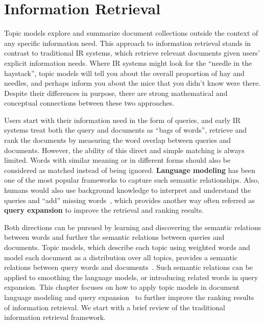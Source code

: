 \chapter{Information Retrieval}
\label{ch:ir}

Topic models explore and summarize document collections outside the context of any specific information need.
This approach to information retrieval stands in contrast to traditional IR systems, which retrieve relevant documents given users' explicit information needs.
Where IR systems might look for the ``needle in the haystack'', topic models will tell you about the overall proportion of hay and needles, and perhaps inform you about the mice that you didn't know were there.
Despite their differences in purpose, there are strong mathematical and conceptual connections between these two approaches.



Users start with their information need in the form of queries, and early IR systems treat both the query and documents as ``bags of words'', retrieve and rank the documents by measuring the word overlap between queries and documents.
However, the ability of this direct and simple matching is always
limited. Words with similar meaning or in different forms should also
be considered as matched instead of being ignored. \textbf{Language
  modeling} has been one of the most popular frameworks to capture
such semantic relationships. Also, humans would also use background
knowledge to interpret and understand the queries and ``add'' missing
words~\citep{wei-07}, which provides another way often referred as
\textbf{query expansion} to improve the retrieval and ranking results.

Both directions can be pursued by learning and discovering the
semantic relations between words and further the semantic relations
between queries and documents. Topic models, which describe each topic
using weighted words and model each document as a distribution over
all topics, provides a semantic relations between query words and
documents~\citep{deerwester-90,hofmann-99a}. Such semantic relations
can be applied to smoothing the language models, or introducing
related words in query expansion. This chapter focuses on how to apply
topic models in document language modeling \citep{Lu-2011,wei-06} and
query expansion~\citep{Park-2009,Andrzejewski-2011} to further improve
the ranking results of information retrieval. We start with a brief
review of the traditional information retrieval framework.

